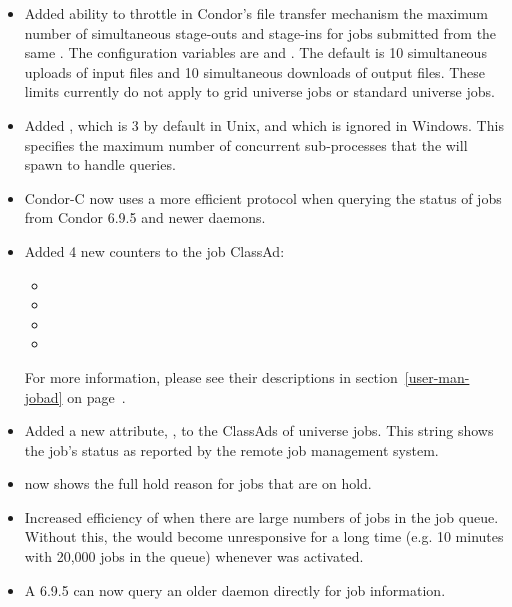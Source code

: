 \begin{itemize}
\item Added ability to throttle in Condor's file transfer mechanism
the maximum number of simultaneous stage-outs and stage-ins for jobs
submitted from the same .  The configuration variables
are  and
.  The default is 10 simultaneous
uploads of input files and 10 simultaneous downloads of output files.
These limits currently do not apply to grid universe jobs or standard
universe jobs.

\item Added , which is 3 by default in
Unix, and which is ignored in Windows.  This specifies the maximum
number of concurrent sub-processes that the  will spawn
to handle queries.

\item Condor-C now uses a more efficient protocol when querying the
status of jobs from Condor 6.9.5 and newer  daemons.

\item Added 4 new counters to the job ClassAd:
 \begin{itemize}
 \item {}
 \item {}
 \item {}
 \item {}
 \end{itemize}
For more information, please see their descriptions in
section~\ref{user-man-jobad} on page~\pageref{user-man-jobad}.

\item Added a new attribute, , to the ClassAds of
 universe jobs. This string shows the job's status as reported
by the remote job management system.

\item {}  now shows the full hold reason for jobs
that are on hold.

\item Increased efficiency of  when there are large
numbers of jobs in the job queue.  Without this, the 
would become unresponsive for a long time (e.g. 10 minutes with 20,000
jobs in the queue) whenever  was activated.

\item A 6.9.5  can now query an older  daemon directly 
for job information.


\end{itemize}
